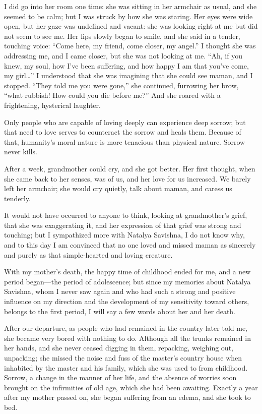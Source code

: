 I did go into her room one time: she was sitting in her armchair as usual, and she seemed to be calm; but I was struck by how she was staring. Her eyes were wide open, but her gaze was undefined and vacant: she was looking right at me but did not seem to see me. Her lips slowly began to smile, and she said in a tender, touching voice: ``Come here, my friend, come closer, my angel.'' I thought she was addressing me, and I came closer, but she was not looking at me. ``Ah, if you knew, my soul, how I've been suffering, and how happy I am that you've come, my girl\ldots{}'' I understood that she was imagining that she could see maman, and I stopped. ``They told me you were gone,'' she continued, furrowing her brow, ``what rubbish! How could you die before me?'' And she roared with a frightening, hysterical laughter.

Only people who are capable of loving deeply can experience deep sorrow; but that need to love serves to counteract the sorrow and heals them. Because of that, humanity's moral nature is more tenacious than physical nature. Sorrow never kills.

After a week, grandmother could cry, and she got better. Her first thought, when she came back to her senses, was of us, and her love for us increased. We barely left her armchair; she would cry quietly, talk about maman, and caress us tenderly.

It would not have occurred to anyone to think, looking at grandmother's grief, that she was exaggerating it, and her expression of that grief was strong and touching; but I sympathized more with Natalya Savishna, I do not know why, and to this day I am convinced that no one loved and missed maman as sincerely and purely as that simple-hearted and loving creature.

With my mother's death, the happy time of childhood ended for me, and a new period began---the period of adolescence; but since my memories about Natalya Savishna, whom I never saw again and who had such a strong and positive influence on my direction and the development of my sensitivity toward others, belongs to the first period, I will say a few words about her and her death.

After our departure, as people who had remained in the country later told me, she became very bored with nothing to do. Although all the trunks remained in her hands, and she never ceased digging in them, repacking, weighing out, unpacking; she missed the noise and fuss of the master's country house when inhabited by the master and his family, which she was used to from childhood. Sorrow, a change in the manner of her life, and the absence of worries soon brought on the infirmities of old age, which she had been awaiting. Exactly a year after my mother passed on, she began suffering from an edema, and she took to bed.

